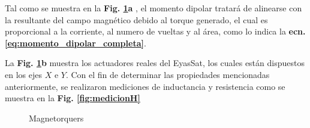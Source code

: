 Tal como se muestra en la \textbf{Fig. \ref{fig:magnetorquers}a} , el momento dipolar tratará de alinearse con la resultante del campo magnético debido al torque generado, el cual es proporcional a la corriente, al numero de vueltas y al área, como lo indica la \textbf{ecn. \eqref{eq:momento_dipolar_completa}}.

La \textbf{Fig. \ref{fig:magnetorquers}b} muestra los actuadores reales del EyasSat, los cuales están dispuestos en los ejes $X$ e $Y$. Con el fin de determinar las propiedades mencionadas anteriormente, se realizaron mediciones de inductancia y resistencia como se muestra en la \textbf{Fig. \ref{fig:medicionH}}

\begin{figure}[h!]
	\centering
	
	\caption{Magnetorquers}
	\label{fig:magnetorquers}
\end{figure}

